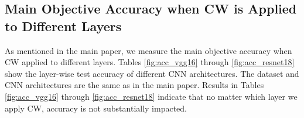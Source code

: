 \documentclass{article}
\begin{document}
\subsection{Main Objective Accuracy when CW is Applied to Different Layers}
\label{sec:acc_all}
As mentioned in the main paper, we measure the main objective accuracy when CW applied to different layers. Tables \ref{fig:acc_vgg16} through  \ref{fig:acc_resnet18} show the layer-wise test accuracy of different CNN architectures. The dataset and CNN architectures are the same as in the main paper. Results in Tables \ref{fig:acc_vgg16} through \ref{fig:acc_resnet18} indicate that no matter which layer we apply CW, accuracy is not substantially impacted.
\begin{table*}[t]
\begin{floatrow}


\end{floatrow}
\end{table*}
\end{document}
